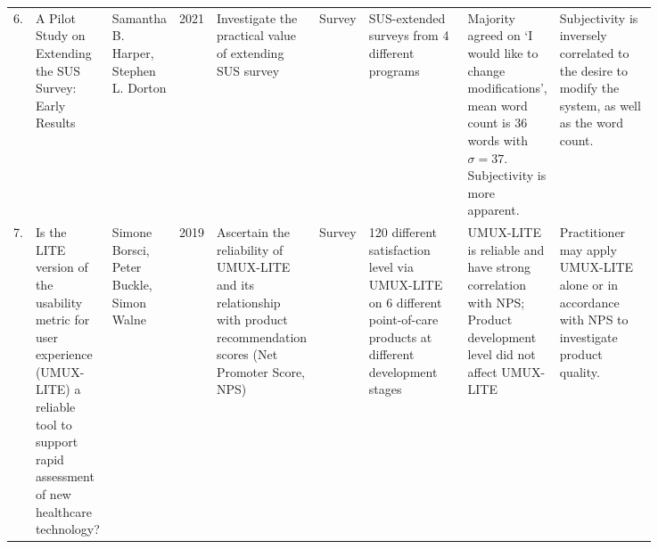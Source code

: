 \documentclass[
  11pt, %
]{assignment}
\begin{document}
\begin{landscape}
\begin{longtable}[l]{r | p{0.075\linewidth} p{0.08\linewidth} m{0.02\linewidth} p{0.15\linewidth} p{0.05\linewidth} p{0.17\linewidth} p{0.13\linewidth} p{0.17\linewidth}}
    6. & A Pilot Study on Extending the SUS Survey: Early Results                                                                                              & Samantha B. Harper, Stephen L. Dorton                                                                                       & 2021 & Investigate the practical value of extending SUS survey                                                                  & Survey             & SUS-extended surveys from 4 different programs                                                                                         & Majority agreed on `I would like to change modifications', mean word count is 36 words with \(\sigma = 37\). Subjectivity is more apparent.                                 & Subjectivity is inversely correlated to the desire to modify the system, as well as the word count.                                                                                                                                                                                                                                                          \\
    7. & Is the LITE version of the usability metric for user experience (UMUX-LITE) a reliable tool to support rapid assessment of new healthcare technology? & Simone Borsci, Peter Buckle, Simon Walne                                                                                    & 2019 & Ascertain the reliability of UMUX-LITE and its relationship with product recommendation scores (Net Promoter Score, NPS) & Survey             & 120 different satisfaction level via UMUX-LITE on 6 different point-of-care products at different development stages                   & UMUX-LITE is reliable and have strong correlation with NPS\@; Product development level did not affect UMUX-LITE                                                            & Practitioner may apply UMUX-LITE alone or in accordance with NPS to investigate product quality.                                                                                                                                                                                                                                                             \\

\end{longtable}
\end{landscape}
\end{document}
